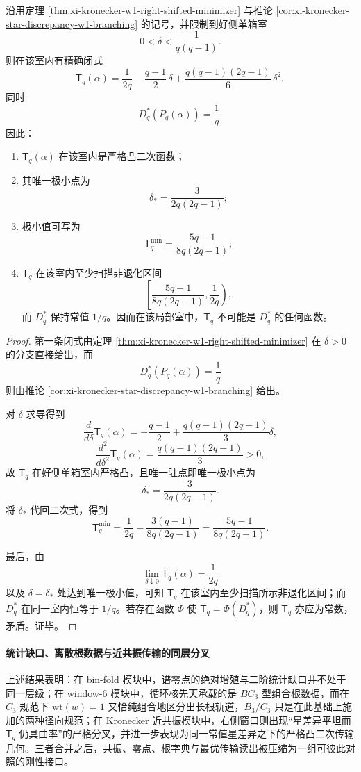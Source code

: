 \begin{corollary}[好侧单箱室中的严格凸传输几何与星差异非完备性]\label{cor:xi-kronecker-good-side-convexity-star-incompleteness}
沿用定理 \ref{thm:xi-kronecker-w1-right-shifted-minimizer} 与推论
\ref{cor:xi-kronecker-star-discrepancy-w1-branching} 的记号，并限制到好侧单箱室
\[
0<\delta<\frac{1}{q(q-1)}.
\]
则在该室内有精确闭式
\[
\mathsf{T}_q(\alpha)
=
\frac{1}{2q}
-\frac{q-1}{2}\,\delta
+\frac{q(q-1)(2q-1)}{6}\,\delta^2,
\]
同时
\[
D_q^\ast(P_q(\alpha))=\frac{1}{q}.
\]
因此：
\begin{enumerate}
  \item \(\mathsf{T}_q(\alpha)\) 在该室内是严格凸二次函数；
  \item 其唯一极小点为
  \[
  \delta_\ast=\frac{3}{2q(2q-1)};
  \]
  \item 极小值可写为
  \[
  \boxed{\;
  \mathsf{T}_q^{\min}
  =
  \frac{5q-1}{8q(2q-1)};\;}
  \]
  \item \(\mathsf{T}_q\) 在该室内至少扫描非退化区间
  \[
  \left[\frac{5q-1}{8q(2q-1)},\frac{1}{2q}\right),
  \]
  而 \(D_q^\ast\) 保持常值 \(1/q\)。因而在该局部室中，\(\mathsf{T}_q\) 不可能是 \(D_q^\ast\) 的任何函数。
\end{enumerate}
\end{corollary}
\begin{proof}
第一条闭式由定理 \ref{thm:xi-kronecker-w1-right-shifted-minimizer} 在 \(\delta>0\) 的分支直接给出，而
\[
D_q^\ast(P_q(\alpha))=\frac{1}{q}
\]
则由推论 \ref{cor:xi-kronecker-star-discrepancy-w1-branching} 给出。

对 \(\delta\) 求导得到
\[
\frac{d}{d\delta}\mathsf{T}_q(\alpha)
=
-\frac{q-1}{2}
+\frac{q(q-1)(2q-1)}{3}\delta,
\]
\[
\frac{d^2}{d\delta^2}\mathsf{T}_q(\alpha)
=
\frac{q(q-1)(2q-1)}{3}>0,
\]
故 \(\mathsf{T}_q\) 在好侧单箱室内严格凸，且唯一驻点即唯一极小点为
\[
\delta_\ast=\frac{3}{2q(2q-1)}.
\]
将 \(\delta_\ast\) 代回二次式，得到
\[
\mathsf{T}_q^{\min}
=
\frac{1}{2q}
-\frac{3(q-1)}{8q(2q-1)}
=
\frac{5q-1}{8q(2q-1)}.
\]

最后，由
\[
\lim_{\delta\downarrow 0}\mathsf{T}_q(\alpha)=\frac{1}{2q}
\]
以及 \(\delta=\delta_\ast\) 处达到唯一极小值，可知 \(\mathsf{T}_q\) 在该室内至少扫描所示非退化区间；而 \(D_q^\ast\) 在同一室内恒等于 \(1/q\)。若存在函数 \(\Phi\) 使 \(\mathsf{T}_q=\Phi(D_q^\ast)\)，则 \(\mathsf{T}_q\) 亦应为常数，矛盾。证毕。
\end{proof}

\paragraph{统计缺口、离散根数据与近共振传输的同层分叉}
上述结果表明：在 bin-fold 模块中，谱零点的绝对增殖与二阶统计缺口并不处于同一层级；在 window-\(6\) 模块中，循环核先天承载的是 \(BC_3\) 型组合根数据，而在 \(C_3\) 规范下 \(\mathrm{wt}(w)=1\) 又恰纯组合地区分出长根轨道，\(B_3/C_3\) 只是在此基础上施加的两种径向规范；在 Kronecker 近共振模块中，右侧窗口则出现“星差异平坦而 \(\mathsf{T}_q\) 仍具曲率”的严格分叉，并进一步表现为同一常值星差异之下的严格凸二次传输几何。三者合并之后，共振、零点、根字典与最优传输读出被压缩为一组可彼此对照的刚性接口。

